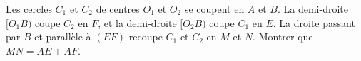 Les cercles $C_1$ et $C_2$ de centres $O_1$ et $O_2$ se coupent en $A$ et $B$. La demi-droite $[O_1B)$ coupe $C_2$ en $F$, et la demi-droite $[O_2B)$ coupe $C_1$ en $E$. La droite passant par $B$ et parallèle à $(EF)$ recoupe $C_1$ et $C_2$ en $M$ et $N$. Montrer que $MN = AE + AF$.
